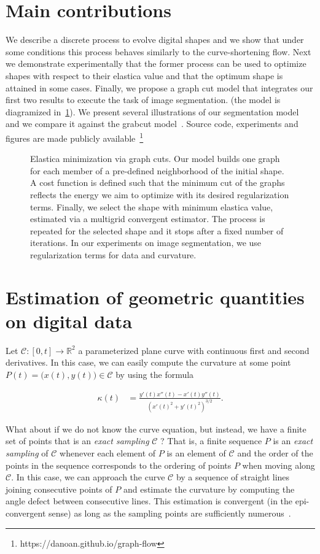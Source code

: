 \documentclass[review]{siamart220329}
\newcommand{\C}{\mathcal{C}} %
\begin{document}
\section{Main contributions}
We describe a discrete process to evolve digital shapes and we show that under
some conditions this process behaves similarly to the curve-shortening flow.
Next we demonstrate experimentally that the former process can be used to
optimize shapes with respect to their elastica value and that the optimum shape
is attained in some cases. Finally, we propose a graph cut model that integrates
our first two results to execute the task of image segmentation. (the model is
diagramized in~\cref{fig:model-overview}). We present several illustrations of
our segmentation model and we compare it against the grabcut
model~\cite{rother04grabcut}. Source code, experiments and figures are made
publicly available~\footnote{https://danoan.github.io/graph-flow}
%
%
\begin{figure}
\center

\caption{Elastica minimization via graph cuts. Our model
builds one graph for each member of a pre-defined neighborhood of the
initial shape. A cost function is defined such that the minimum cut of the 
graphs reflects the energy we aim to optimize with its desired regularization 
terms. Finally, we select the shape with minimum elastica value, estimated 
via a multigrid convergent estimator. The process is repeated for the selected 
shape and it stops after a fixed number of iterations. In our experiments 
on image segmentation, we use regularization terms for data and curvature.}
\label{fig:model-overview}
\end{figure}
%
%
%
%
%
\section{Estimation of geometric quantities on digital data}

Let $\C:[0,t] \rightarrow \mathbb{R}^2$ a parameterized plane curve with
continuous first and second derivatives. In this case, we can easily compute the
curvature at some point $P(t) = \big( x(t),y(t) \big) \in \C$ by using the
formula

\begin{align*}
  \kappa (t) &= \frac{y'(t)x''(t) -x'(t)y''(t)}{(x'(t)^2 + y'(t)^2)^{3/2}}.
\end{align*}

What about if we do not know the curve equation, but instead, we have a finite
set of points that is an \emph{exact sampling} $\C$ ? That is, a finite sequence
$P$ is an {\em exact sampling} of $\C$ whenever each element of $P$ is an element
of $\C$ and the order of the points in the sequence corresponds to the ordering
of points $P$ when moving along $\C$. In this case, we can approach the curve $\C$
by a sequence of straight lines joining consecutive points of $P$ and estimate
the curvature by computing the angle defect between consecutive lines. This
estimation is convergent (in the epi-convergent sense) as long as the sampling
points are sufficiently
numerous~\cite{bruckstein01discrete,bruckstein01convergence}.
\end{document}
